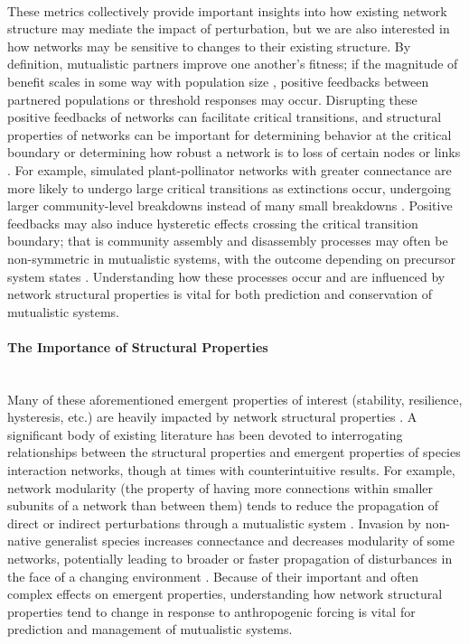 \paragraph{}
These metrics collectively provide important insights into how existing network structure may mediate the impact of perturbation, but we are also interested in how networks may be sensitive to changes to their existing structure. By definition, mutualistic partners improve one another's fitness; if the magnitude of benefit scales in some way with population size \parencite{valdovinos2019mutualistic}, positive feedbacks between partnered populations or threshold responses \parencite{hale2021ecological} may occur. Disrupting these positive feedbacks of networks can facilitate critical transitions, and structural properties of networks can be important for determining behavior at the critical boundary or determining how robust a network is to loss of certain nodes or links \parencite{van2021facultative}. For example, simulated plant-pollinator networks with greater connectance are more likely to undergo large critical transitions as extinctions occur, undergoing larger community-level breakdowns instead of many small breakdowns \parencite{lever2014sudden}. Positive feedbacks may also induce hysteretic effects crossing the critical transition boundary; that is community assembly and disassembly processes may often be non-symmetric in mutualistic systems, with the outcome depending on precursor system states \parencite{cai2020mutualistic}. Understanding how these processes occur and are influenced by network structural properties is vital for both prediction and conservation of mutualistic systems.


\paragraph*{The Importance of Structural Properties}\mbox{}\\ 
Many of these aforementioned emergent properties of interest (stability, resilience, hysteresis, etc.) are heavily impacted by network structural properties \parencite{landi2018complexity}. A significant body of existing literature has been devoted to interrogating relationships between the structural properties and emergent properties of species interaction networks, though at times with counterintuitive results. For example, network modularity (the property of having more connections within smaller subunits of a network than between them) tends to reduce the propagation of direct or indirect perturbations through a mutualistic system \parencite{thebault2010stability, okuyama2008network}. Invasion by non-native generalist species increases connectance and decreases modularity of some networks, potentially leading to broader or faster propagation of disturbances in the face of a changing environment \parencite{fricke2020accelerating, vollstadt2022plant, martins2024propagation}.  Because of their important and often complex effects on emergent properties, understanding how network structural properties tend to change in response to anthropogenic forcing is vital for prediction and management of mutualistic systems. 


